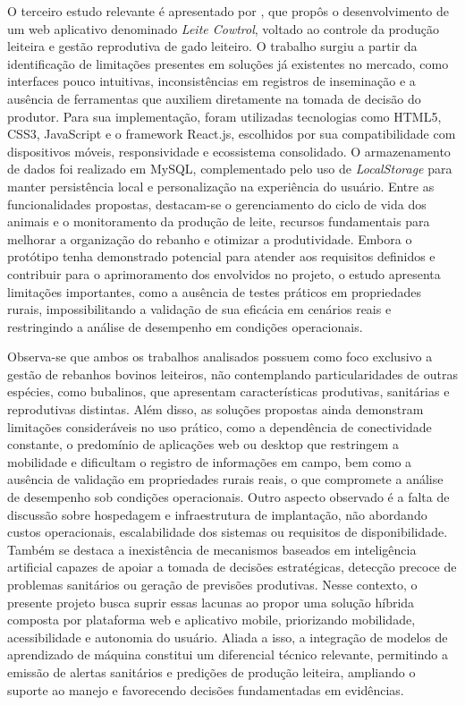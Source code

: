 \documentclass[11pt,a4paper]{article}
\begin{document}
O terceiro estudo relevante é apresentado por \cite{LIMA2023}, que propôs o desenvolvimento de um web aplicativo denominado \textit{Leite Cowtrol}, voltado ao controle da produção leiteira e gestão reprodutiva de gado leiteiro. O trabalho surgiu a partir da identificação de limitações presentes em soluções já existentes no mercado, como interfaces pouco intuitivas, inconsistências em registros de inseminação e a ausência de ferramentas que auxiliem diretamente na tomada de decisão do produtor. Para sua implementação, foram utilizadas tecnologias como HTML5, CSS3, JavaScript e o framework React.js, escolhidos por sua compatibilidade com dispositivos móveis, responsividade e ecossistema consolidado. O armazenamento de dados foi realizado em MySQL, complementado pelo uso de \textit{LocalStorage} para manter persistência local e personalização na experiência do usuário. Entre as funcionalidades propostas, destacam-se o gerenciamento do ciclo de vida dos animais e o monitoramento da produção de leite, recursos fundamentais para melhorar a organização do rebanho e otimizar a produtividade. Embora o protótipo tenha demonstrado potencial para atender aos requisitos definidos e contribuir para o aprimoramento dos envolvidos no projeto, o estudo apresenta limitações importantes, como a ausência de testes práticos em propriedades rurais, impossibilitando a validação de sua eficácia em cenários reais e restringindo a análise de desempenho em condições operacionais.

Observa-se que ambos os trabalhos analisados possuem como foco exclusivo a gestão de rebanhos bovinos leiteiros, não contemplando particularidades de outras espécies, como bubalinos, que apresentam características produtivas, sanitárias e reprodutivas distintas. Além disso, as soluções propostas ainda demonstram limitações consideráveis no uso prático, como a dependência de conectividade constante, o predomínio de aplicações web ou desktop que restringem a mobilidade e dificultam o registro de informações em campo, bem como a ausência de validação em propriedades rurais reais, o que compromete a análise de desempenho sob condições operacionais. Outro aspecto observado é a falta de discussão sobre hospedagem e infraestrutura de implantação, não abordando custos operacionais, escalabilidade dos sistemas ou requisitos de disponibilidade.  Também se destaca a inexistência de mecanismos baseados em inteligência artificial capazes de apoiar a tomada de decisões estratégicas, detecção precoce de problemas sanitários ou geração de previsões produtivas. Nesse contexto, o presente projeto busca suprir essas lacunas ao propor uma solução híbrida composta por plataforma web e aplicativo mobile, priorizando mobilidade, acessibilidade e autonomia do usuário. Aliada a isso, a integração de modelos de aprendizado de máquina constitui um diferencial técnico relevante, permitindo a emissão de alertas sanitários e predições de produção leiteira, ampliando o suporte ao manejo e favorecendo decisões fundamentadas em evidências.
\end{document}

